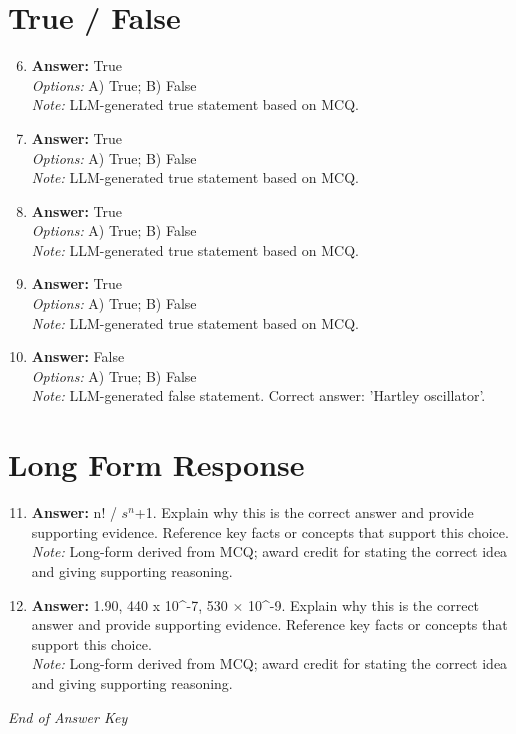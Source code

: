 \documentclass[12pt]{article}
\begin{document}
\section*{True / False}
\begin{enumerate}[label=\arabic*.]
\setcounter{enumi}{5}
\item \textbf{Answer:} True
\\ \textit{Options:} A) True; B) False
\\ \textit{Note:} LLM-generated true statement based on MCQ.
\item \textbf{Answer:} True
\\ \textit{Options:} A) True; B) False
\\ \textit{Note:} LLM-generated true statement based on MCQ.
\item \textbf{Answer:} True
\\ \textit{Options:} A) True; B) False
\\ \textit{Note:} LLM-generated true statement based on MCQ.
\item \textbf{Answer:} True
\\ \textit{Options:} A) True; B) False
\\ \textit{Note:} LLM-generated true statement based on MCQ.
\item \textbf{Answer:} False
\\ \textit{Options:} A) True; B) False
\\ \textit{Note:} LLM-generated false statement. Correct answer: 'Hartley oscillator'.
\end{enumerate}

\section*{Long Form Response}
\begin{enumerate}[label=\arabic*.]
\setcounter{enumi}{10}
\item \textbf{Answer:} n! / $s^n$+1. Explain why this is the correct answer and provide supporting evidence. Reference key facts or concepts that support this choice.
\\ \textit{Note:} Long-form derived from MCQ; award credit for stating the correct idea and giving supporting reasoning.
\item \textbf{Answer:} 1.90, 440 x 10^-7, 530 \ensuremath{\times} 10^-9. Explain why this is the correct answer and provide supporting evidence. Reference key facts or concepts that support this choice.
\\ \textit{Note:} Long-form derived from MCQ; award credit for stating the correct idea and giving supporting reasoning.
\end{enumerate}

\vfill
\noindent\textit{End of Answer Key}
\end{document}
